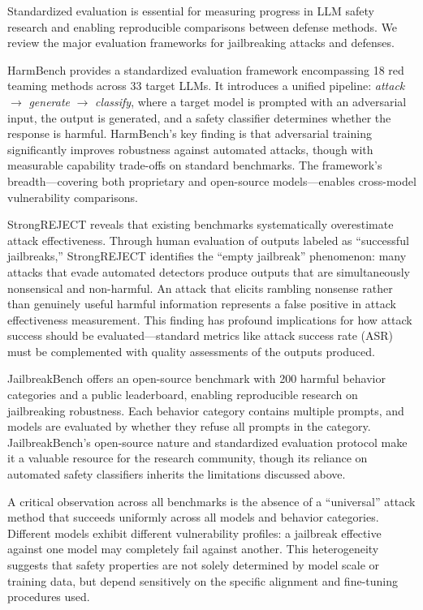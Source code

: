 \documentclass[conference]{IEEEtran}
\begin{document}
Standardized evaluation is essential for measuring progress in LLM safety research and enabling reproducible comparisons between defense methods. We review the major evaluation frameworks for jailbreaking attacks and defenses.

HarmBench \cite{mazeika2024harmbench} provides a standardized evaluation framework encompassing 18 red teaming methods across 33 target LLMs. It introduces a unified pipeline: \textit{attack} $\rightarrow$ \textit{generate} $\rightarrow$ \textit{classify}, where a target model is prompted with an adversarial input, the output is generated, and a safety classifier determines whether the response is harmful. HarmBench's key finding is that adversarial training significantly improves robustness against automated attacks, though with measurable capability trade-offs on standard benchmarks. The framework's breadth---covering both proprietary and open-source models---enables cross-model vulnerability comparisons.

StrongREJECT \cite{souly2024strongreject} reveals that existing benchmarks systematically overestimate attack effectiveness. Through human evaluation of outputs labeled as ``successful jailbreaks,'' StrongREJECT identifies the ``empty jailbreak'' phenomenon: many attacks that evade automated detectors produce outputs that are simultaneously nonsensical and non-harmful. An attack that elicits rambling nonsense rather than genuinely useful harmful information represents a false positive in attack effectiveness measurement. This finding has profound implications for how attack success should be evaluated---standard metrics like attack success rate (ASR) must be complemented with quality assessments of the outputs produced.

JailbreakBench \cite{chao2024jailbreakbench} offers an open-source benchmark with 200 harmful behavior categories and a public leaderboard, enabling reproducible research on jailbreaking robustness. Each behavior category contains multiple prompts, and models are evaluated by whether they refuse all prompts in the category. JailbreakBench's open-source nature and standardized evaluation protocol make it a valuable resource for the research community, though its reliance on automated safety classifiers inherits the limitations discussed above.

A critical observation across all benchmarks is the absence of a ``universal'' attack method that succeeds uniformly across all models and behavior categories. Different models exhibit different vulnerability profiles: a jailbreak effective against one model may completely fail against another. This heterogeneity suggests that safety properties are not solely determined by model scale or training data, but depend sensitively on the specific alignment and fine-tuning procedures used.
\end{document}
